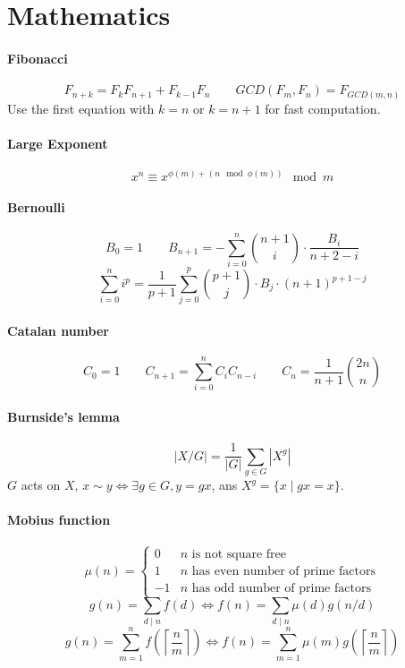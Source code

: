 \documentclass[a4paper,9pt]{article}
\begin{document}
	
\tableofcontents
	
\section{Mathematics}
	
\paragraph{Fibonacci}
$$ F_{n+k} = F_k F_{n+1} + F_{k-1} F_n \qquad GCD(F_m, F_n) = F_{GCD(m, n)} $$
Use the first equation with $k=n$ or $k=n+1$ for fast computation.
	
\paragraph{Large Exponent}
$$ x^n \equiv x^{\phi(m) + \left( n \!\!\!\mod \phi(m) \right)} \mod m $$

\paragraph{Bernoulli}
$$ B_0 = 1 \qquad B_{n+1} = - \sum_{i = 0}^{n} \binom{n+1}{i} \cdot \frac{B_i}{n+2-i} $$
$$ \sum_{i=0}^{n} i^p = \frac{1}{p+1} \sum_{j = 0}^p \binom{p+1}{j} \cdot B_j \cdot (n+1)^{p+1-j} $$
	
\paragraph{Catalan number}
$$ C_0 = 1 \qquad C_{n+1} = \sum_{i = 0}^n C_i C_{n-i} \qquad C_n = \frac{1}{n+1} \binom{2n}{n} $$

\paragraph{Burnside's lemma}
$$ \left| X / G \right| = \frac{1}{|G|} \sum_{g \in G} \left| X^g \right| $$
$G$ acts on $X$, $x \sim y \Leftrightarrow \exists g \in G, y = gx$, ans $X^g = \{ x \mid gx = x \}$.

\paragraph{Mobius function}

$$ \mu(n) = \left \{ \begin{array}{ll}
	0 & n \text{ is not square free} \\
	1 & n \text{ has even number of prime factors} \\
	-1 & n \text{ has odd number of prime factors}
\end{array} \right. $$
$$ g(n) = \sum_{d \mid n} f(d) \Leftrightarrow f(n) = \sum_{d \mid n} \mu(d) g(n/d) $$
$$ g(n) = \sum_{m = 1}^n f \left( \left\lceil \frac{n}{m} \right\rceil \right) \Leftrightarrow f(n) = \sum_{m = 1}^n \mu(m) g \left( \left\lceil \frac{n}{m} \right\rceil \right) $$
\end{document}
